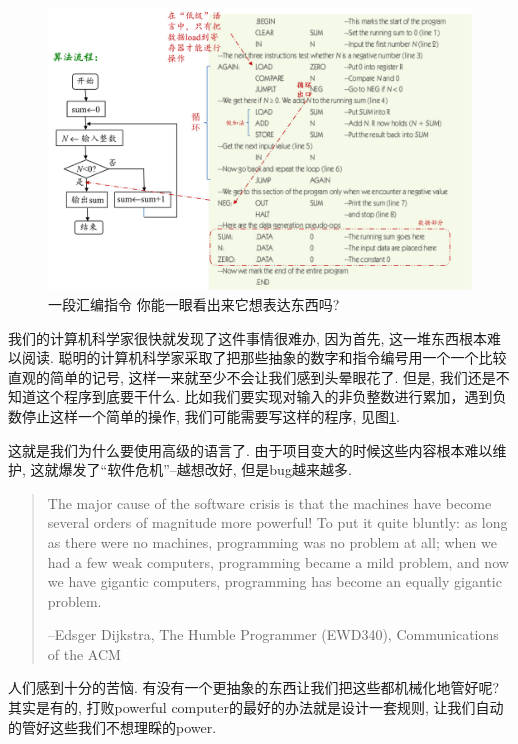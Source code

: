 \begin{figure}[h!]
	\centering
	\includegraphics[scale=0.5]{4-programs/figs/asm-example.png}
	\caption{一段汇编指令 你能一眼看出来它想表达东西吗?}
	\label{figs:asm-eg}
	
\end{figure}

我们的计算机科学家很快就发现了这件事情很难办, 因为首先, 这一堆东西根本难以阅读. 聪明的计算机科学家采取了把那些抽象的数字和指令编号用一个一个比较直观的简单的记号, 这样一来就至少不会让我们感到头晕眼花了. 但是, 我们还是不知道这个程序到底要干什么. 比如我们要实现对输入的非负整数进行累加，遇到负数停止这样一个简单的操作, 我们可能需要写这样的程序, 见图\ref{figs:asm-eg}.

这就是我们为什么要使用高级的语言了. 由于项目变大的时候这些内容根本难以维护, 这就爆发了``软件危机''--越想改好, 但是bug越来越多. 

\begin{quote}
	The major cause of the software crisis is that the machines have become several orders of magnitude more powerful! To put it quite bluntly: as long as there were no machines, programming was no problem at all; when we had a few weak computers, programming became a mild problem, and now we have gigantic computers, programming has become an equally gigantic problem.
	
	\hfill --Edsger Dijkstra, The Humble Programmer (EWD340), Communications of the ACM
\end{quote}

人们感到十分的苦恼. 有没有一个更抽象的东西让我们把这些都机械化地管好呢? 其实是有的, 打败powerful computer的最好的办法就是设计一套规则, 让我们自动的管好这些我们不想理睬的power. 


